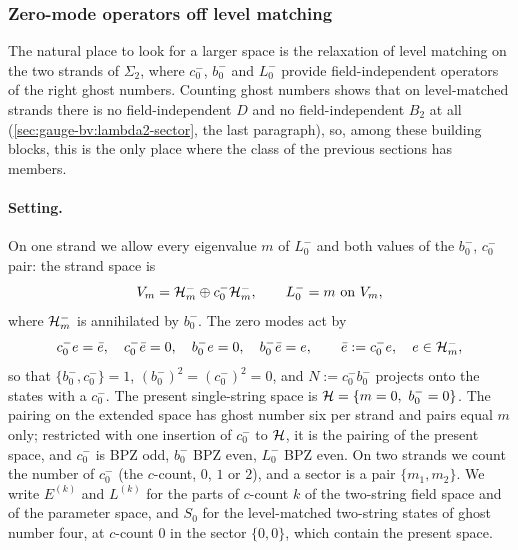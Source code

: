 \subsubsection{Zero-mode operators off level matching}
\label{sec:gauge-bv:zero-modes}


The natural place to look for a larger space is the relaxation of level matching on the two strands of $\Sigma_2$, where $c_0^-$, $b_0^-$ and $L_0^-$ provide field-independent operators of the right ghost numbers.
Counting ghost numbers shows that on level-matched strands there is no field-independent $D$ and no field-independent $B_2$ at all (\cref{sec:gauge-bv:lambda2-sector}, the last paragraph), so, among these building blocks, this is the only place where the class of the previous sections has members.

\paragraph{Setting.}
On one strand we allow every eigenvalue $m$ of $L_0^-$ and both values of the $b_0^-$, $c_0^-$ pair: the strand space is
\begin{equation}
  \label{eq:gbv:strand-space}
  V_m
    = \mathcal{H}_m^- \oplus c_0^- \mathcal{H}_m^-,
  \qquad
  L_0^-
    = m
  \text{ on } V_m,
\end{equation}
where $\mathcal{H}_m^-$ is annihilated by $b_0^-$.
The zero modes act by
\begin{equation}
  \label{eq:gbv:zero-modes}
  c_0^- e
    = \bar e,
  \quad
  c_0^- \bar e
    = 0,
  \quad
  b_0^- e
    = 0,
  \quad
  b_0^- \bar e
    = e,
  \qquad
  \bar e
    := c_0^- e,
  \quad
  e \in \mathcal{H}_m^-,
\end{equation}
so that $\{ b_0^-, c_0^- \} = 1$, $(b_0^-)^2 = (c_0^-)^2 = 0$, and $N := c_0^- b_0^-$ projects onto the states with a $c_0^-$.
The present single-string space is $\mathcal{H} = \{ m = 0, \ b_0^- = 0 \}$.
The pairing on the extended space has ghost number six per strand and pairs equal $m$ only; restricted with one insertion of $c_0^-$ to $\mathcal{H}$, it is the pairing of the present space, and $c_0^-$ is BPZ odd, $b_0^-$ BPZ even, $L_0^-$ BPZ even.
On two strands we count the number of $c_0^-$ (the $c$-count, $0$, $1$ or $2$), and a sector is a pair $\{ m_1, m_2 \}$.
We write $E^{(k)}$ and $L^{(k)}$ for the parts of $c$-count $k$ of the two-string field space and of the parameter space, and $S_0$ for the level-matched two-string states of ghost number four, at $c$-count $0$ in the sector $\{ 0, 0 \}$, which contain the present space.

